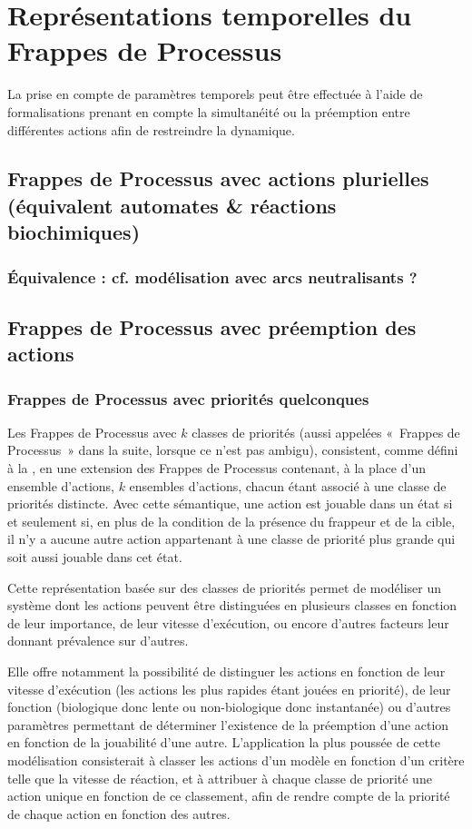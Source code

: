

\chapter{Représentations temporelles du Frappes de Processus}

La prise en compte de paramètres temporels peut être effectuée à l'aide de
formalisations prenant en compte la simultanéité ou la préemption
entre différentes actions afin de restreindre la dynamique.

\section{Frappes de Processus avec actions plurielles
  (équivalent automates \& réactions biochimiques)}
\subsection{Équivalence : cf. modélisation avec arcs neutralisants ?}

\section{Frappes de Processus avec préemption des actions}
\subsection{Frappes de Processus avec priorités quelconques}

Les Frappes de Processus avec $k$ classes de priorités
(aussi appelées «~Frappes de Processus~» dans la suite, lorsque ce n'est pas ambigu),
consistent, comme défini à la ,
en une extension des Frappes de Processus contenant, à la place d'un ensemble d'actions,
$k$ ensembles d'actions, chacun étant associé à une classe de priorités distincte.
Avec cette sémantique, une action est jouable dans un état si et seulement si,
en plus de la condition de la présence du frappeur et de la cible,
il n'y a aucune autre action appartenant à une classe de priorité plus grande
qui soit aussi jouable dans cet état.

Cette représentation basée sur des classes de priorités permet de modéliser un système
dont les actions peuvent être distinguées en plusieurs classes en fonction de leur importance,
de leur vitesse d'exécution, ou encore d'autres facteurs leur donnant prévalence sur d'autres.

Elle offre notamment la possibilité de distinguer les actions en fonction 
de leur vitesse d'exécution (les actions les plus rapides étant jouées en priorité),
de leur fonction (biologique donc lente ou non-biologique donc instantanée)
ou d'autres paramètres permettant de déterminer l'existence de la préemption d'une action
en fonction de la jouabilité d'une autre.
L'application la plus poussée de cette modélisation consisterait à
classer les actions d'un modèle en fonction d'un critère telle que la vitesse de réaction,
et à attribuer à chaque classe de priorité une action unique en fonction de ce classement,
afin de rendre compte de la priorité de chaque action en fonction des autres.

